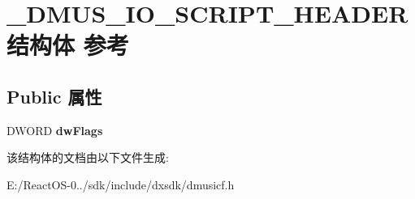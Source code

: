 \hypertarget{struct___d_m_u_s___i_o___s_c_r_i_p_t___h_e_a_d_e_r}{}\section{\+\_\+\+D\+M\+U\+S\+\_\+\+I\+O\+\_\+\+S\+C\+R\+I\+P\+T\+\_\+\+H\+E\+A\+D\+E\+R结构体 参考}
\label{struct___d_m_u_s___i_o___s_c_r_i_p_t___h_e_a_d_e_r}
\subsection*{Public 属性}
\begin{DoxyCompactItemize}
\item 
\mbox{\label{struct___d_m_u_s___i_o___s_c_r_i_p_t___h_e_a_d_e_r_ad53d2440228be9ef0f13a267cc2c701c}} 
D\+W\+O\+RD {\bfseries dw\+Flags}
\end{DoxyCompactItemize}


该结构体的文档由以下文件生成\+:\begin{DoxyCompactItemize}
\item 
E\+:/\+React\+O\+S-\/0../sdk/include/dxsdk/dmusicf.\+h\end{DoxyCompactItemize}
